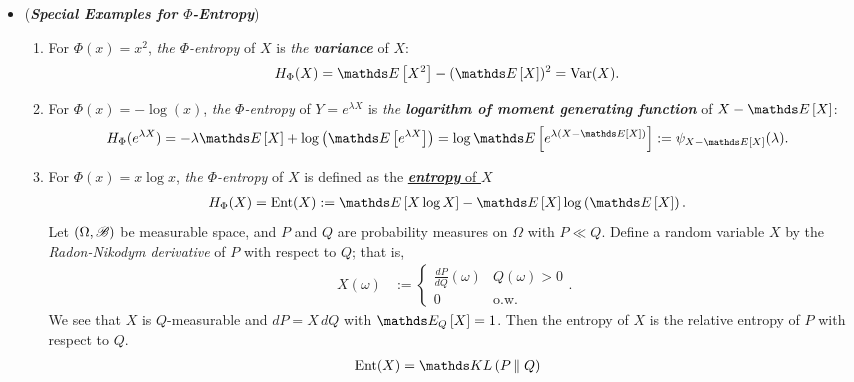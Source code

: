 \documentclass[11pt]{article}
\begin{document}
\begin{itemize}
\item \begin{example} (\emph{\textbf{Special Examples for $\Phi$-Entropy}})
\begin{enumerate}
\item For $\Phi(x) = x^2$, \emph{the $\Phi$-entropy} of $X$ is \emph{the \textbf{variance}} of $X$:
\begin{align*}
H_{\Phi}(X) &= \E{}{X^2} - (\E{}{X})^2 = \text{Var}(X).
\end{align*}
\item For $\Phi(x) = -\log(x)$, \emph{the $\Phi$-entropy} of $Y=e^{\lambda X}$ is \emph{the \textbf{logarithm of moment generating function}} of $X - \E{}{X}$:
\begin{align}
H_{\Phi}(e^{\lambda X}) &= -\lambda \E{}{X} + \log\paren{\E{}{e^{\lambda X}}} = \log\E{}{e^{\lambda(X - \E{}{X})}} := \psi_{X- \E{}{X}}(\lambda). \label{eqn: phi_entropy_log_mgf}
\end{align}
\item For $\Phi(x) = x\log x$, \emph{the $\Phi$-entropy} of $X$ is defined as the \underline{\emph{\textbf{entropy}} of $X$}
\begin{align}
H_{\Phi}(X) = \text{Ent}(X)&:=  \E{}{X\log X} - \E{}{X}\log\paren{\E{}{X}}. \label{def: phi_entropy_kl}
\end{align} Let $(\Omega, {\mathscr B})$ be measurable space, and $P$ and $Q$ are probability measures on $\Omega$ with $P \ll Q$. Define a random variable $X$ by the \emph{Radon-Nikodym derivative} of $P$ with respect to $Q$; that is,
\begin{align*}
X(\omega) &:= \left\{ \begin{array}{cc}
\frac{dP}{dQ}(\omega) & Q(\omega) > 0\\
0 &\text{o.w.}
\end{array}
\right. .
\end{align*} We see that $X$ is $Q$-measurable and $dP = X\,dQ$ with $\E{Q}{X} = 1$. Then the entropy of $X$ is the relative entropy of $P$ with respect to $Q$.
\begin{align}
\text{Ent}(X)&= \kl{P}{Q} \label{eqn: phi_entropy_kl_divg}
\end{align}
\end{enumerate}
\end{example}

\end{itemize}
\end{document}
